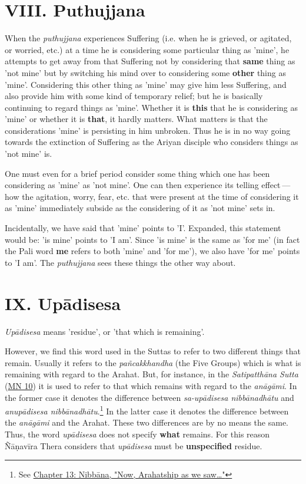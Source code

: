 \hypertarget{x-viii.-puthujjana}{\section*{VIII. Puthujjana}}
When the \emph{puthujjana} experiences Suffering (i.e. when he is grieved, or
agitated, or worried, etc.) at a time he is considering some particular
thing as 'mine', he attempts to get away from that Suffering not by
considering that \textbf{same} thing as 'not mine' but by switching his mind over
to considering some \textbf{other} thing as 'mine'. Considering this other thing
as 'mine' may give him less Suffering, and also provide him with some
kind of temporary relief; but he is basically continuing to regard
things as 'mine'. Whether it is \textbf{this} that he is considering as 'mine' or
whether it is \textbf{that}, it hardly matters. What matters is that the
considerations 'mine' is persisting in him unbroken. Thus he is in no
way going towards the extinction of Suffering as the Ariyan disciple who
considers things as 'not mine' is.


One must even for a brief period consider some thing which one has
been considering as 'mine' as 'not mine'. One can then experience its
telling effect — how the agitation, worry, fear, etc. that were present
at the time of considering it as 'mine' immediately subside as the
considering of it as 'not mine' sets in.


Incidentally, we have said that 'mine' points to 'I'. Expanded, this
statement would be: 'is mine' points to 'I am'. Since 'is mine' is the
same as 'for me' (in fact the Pali word \textbf{me} refers to both 'mine' and
'for me'), we also have 'for me' points to 'I am'. The \emph{puthujjana} sees
these things the other way about.


\hypertarget{x-ix.-upādisesa}{\section*{IX. Upādisesa}}
\emph{Upādisesa} means 'residue', or 'that which is remaining'.


However, we find this word used in the Suttas to refer to two different
things that remain. Usually it refers to the \emph{pañcakkhandha} (the Five
Groups) which is what is remaining with regard to the Arahat. But, for
instance, in the \emph{Satipatthāna Sutta} (\href{https://suttacentral.net/mn10/en/sujato}{MN 10}) it is used to
refer to that which remains with regard to the \emph{anāgāmi}. In the former
case it denotes the difference between \emph{sa-upādisesa nibbānadhātu} and
\emph{anupādisesa nibbānadhātu}.\footnote{See \hyperlink{ch-13-nibbana#remainder}{Chapter 13: Nibbāna, "Now, Arahatship as we saw…​"}}
In the latter case it denotes
the difference between the \emph{anāgāmi} and the Arahat. These two differences
are by no means the same. Thus, the word \emph{upādisesa} does not specify \textbf{what}
remains. For this reason Ñāṇavīra Thera considers that \emph{upādisesa} must be
\textbf{unspecified} residue.


